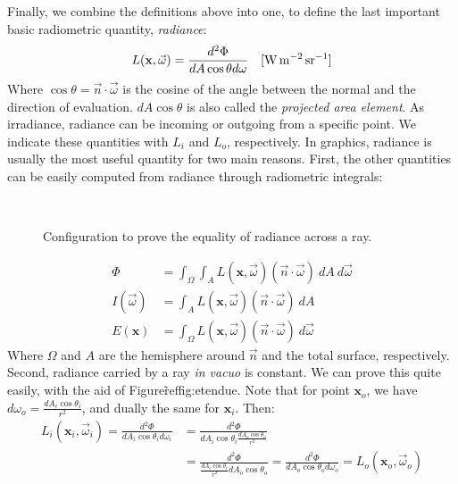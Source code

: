 Finally, we combine the definitions above into one, to define the last important basic radiometric quantity, \emph{radiance}:
$$
L(\mathbf{x}, \vec{\omega}) = \frac{d^2 \Phi}{d A \cos\theta d \omega}  \siunit{\watt \per \square \metre \per \steradian}
$$
Where $\cos \theta = \vec{n} \cdot \vec{\omega}$ is the cosine of the angle between the normal and the direction of evaluation. $d A \cos\theta$ is also called the \emph{projected area element}. As irradiance, radiance can be incoming or outgoing from a specific point. We indicate these quantities with $L_i$ and $L_o$, respectively. In graphics, radiance is usually the most useful quantity for two main reasons. First, the other quantities can be easily computed from radiance through radiometric integrals:
\begin{figure}
\centering
   \def\svgwidth{0.8\textwidth}
    \\
\caption{Configuration to prove the equality of radiance across a ray.} %
\label{fig:etendue}
\end{figure}
\begin{equation*}
\begin{split}
\Phi &= \int_{\Omega} \int_{A} L(\mathbf{x}, \vec{\omega})  (\vec{n} \cdot \vec{\omega}) \ dA \ d \vec{\omega} \\
I(\vec{\omega}) &= \int_{A} L(\mathbf{x}, \vec{\omega})  (\vec{n} \cdot \vec{\omega}) \ dA  \\
E(\mathbf{x}) &= \int_{\Omega} L(\mathbf{x}, \vec{\omega})  (\vec{n} \cdot \vec{\omega}) \ d \vec{\omega} 
\end{split}
\end{equation*}
Where $\Omega$ and $A$ are the hemisphere around $\vec{n}$ and the total surface, respectively. Second, radiance carried by a ray \emph{in vacuo} is constant. We can prove this quite easily, with the aid of Figure\~ref{fig:etendue}. Note that for point $\mathbf{x}_o$, we have $d \omega_o = \frac{d A_i \cos\theta_i}{r^2}$, and dually the same for $\mathbf{x}_i$. Then:
\begin{equation*}
\begin{split}
L_i(\mathbf{x}_i, \vec{\omega}_i) = \frac{d^2 \Phi}{d A_i \cos\theta_i d \omega_i} &= 
\frac{d^2 \Phi}{d A_i \cos\theta_i \frac{d A_o \cos\theta_o}{r^2}}  
\\ &= \frac{d^2 \Phi}{\frac{d A_i \cos\theta_i}{r^2} d A_o \cos\theta_o } 
= \frac{d^2 \Phi}{d A_o \cos\theta_o d \omega_o} = L_o(\mathbf{x}_o, \vec{\omega}_o)
\end{split}
\end{equation*}

